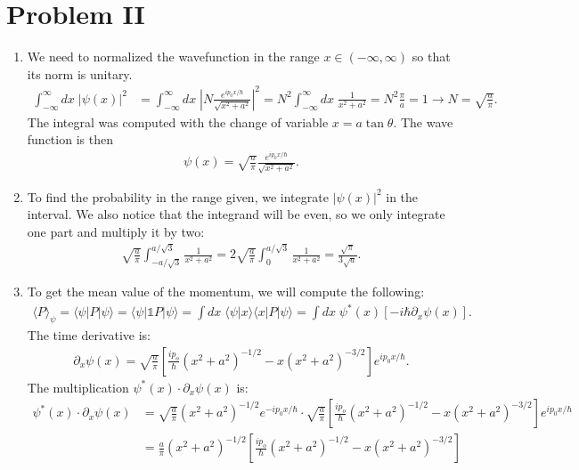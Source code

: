 \documentclass[letterpaper,11pt,twoside]{article}
\newcommand{\braket}[1]{\langle#1\rangle}
\begin{document}
\section*{Problem II}
\begin{enumerate}[itemsep=0pt,topsep=0pt,label=\alph*.]
  \item We need to normalized the wavefunction in the range $x\in(-\infty,\infty)$ so that its norm is unitary.
  \begin{align*}
    \int_{-\infty}^\infty dx\;|\psi(x)|^2&=\int_{-\infty}^\infty dx\;\left|N\frac{e^{ip_0x/\hbar}}{\sqrt{x^2+a^2}}\right|^2=N^2\int_{-\infty}^\infty dx\;\frac{1}{x^2+a^2}=N^2\frac{\pi}{a}=1\longrightarrow N=\sqrt{\frac{a}{\pi}}.
  \end{align*}
  The integral was computed with the change of variable $x=a\tan\theta$. The wave function is then
  \begin{align*}
    \psi(x)=\sqrt{\frac{a}{\pi}}\frac{e^{ip_0x/\hbar}}{\sqrt{x^2+a^2}}.
  \end{align*}
  \item To find the probability in the range given, we integrate $|\psi(x)|^2$ in the interval. We also notice that the integrand will be even, so we only integrate one part and multiply it by two:
  \begin{align*}
    \sqrt{\frac{a}{\pi}}\int_{-a/\sqrt{3}}^{a/\sqrt{3}}\frac{1}{x^2+a^2}=2\sqrt{\frac{a}{\pi}}\int_{0}^{a/\sqrt{3}}\frac{1}{x^2+a^2}=\frac{\sqrt{\pi}}{3\sqrt{a}}.
  \end{align*}
  \item To get the mean value of the momentum, we will compute the following:
  \begin{align*}
    \braket{P}_\psi=\braket{\psi|P|\psi}=\braket{\psi|\mathds{1}P|\psi}=\int dx\;\braket{\psi|x}\braket{x|P|\psi}=\int dx\;\psi^*(x)[-i\hbar\partial_x\psi(x)].
  \end{align*}
  The time derivative is:
  \begin{align*}
    \partial_x\psi(x)=\sqrt{\frac{a}{\pi}}\left[\frac{ip_o}{\hbar}(x^2+a^2)^{-1/2}-x(x^2+a^2)^{-3/2}\right]e^{ip_0x/\hbar}.
  \end{align*}
  The multiplication $\psi^*(x)\cdot\partial_x\psi(x)$ is:
  \begin{align*}
    \psi^*(x)\cdot\partial_x\psi(x)&=\sqrt{\frac{a}{\pi}}(x^2+a^2)^{-1/2}e^{-ip_0x/\hbar}\cdot\sqrt{\frac{a}{\pi}}\left[\frac{ip_o}{\hbar}(x^2+a^2)^{-1/2}-x(x^2+a^2)^{-3/2}\right]e^{ip_0x/\hbar}\\
    &=\frac{a}{\pi}(x^2+a^2)^{-1/2}\left[\frac{ip_o}{\hbar}(x^2+a^2)^{-1/2}-x(x^2+a^2)^{-3/2}\right]\\

\end{align*}
\end{enumerate}
\end{document}
